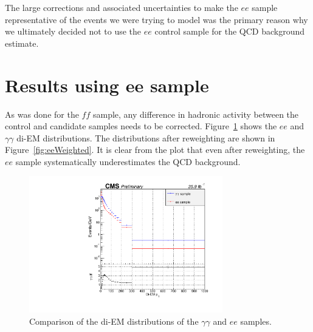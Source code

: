 The large corrections and associated uncertainties
to make the $ee$ sample representative of the
events we were trying to model
was the primary reason why we ultimately
decided not to use the $ee$ control sample for the
QCD background estimate.


\section{Results using ee sample}
\label{sec:eeResults}
As was done for the $ff$ sample,
any difference in hadronic activity between the control and candidate
samples needs to be corrected.
Figure~\ref{fig:eediEMPTRatio} shows the $ee$ and 
$\gamma\gamma$ di-EM \pt distributions. 
The \ETmiss distributions after reweighting are shown in Figure~\ref{fig:eeWeighted}.
It is clear from the plot that even after \diempt reweighting, the $ee$ sample 
systematically underestimates the QCD background.

\begin{figure}[h]
\begin{center}
\includegraphics[width=0.75\textwidth]{Figures/Appendix/eeDiempt.pdf}
\end{center}
\caption{Comparison of the di-EM \pt distributions of the $\gamma\gamma$ and $ee$ samples.}
\label{fig:eediEMPTRatio}
\end{figure}

